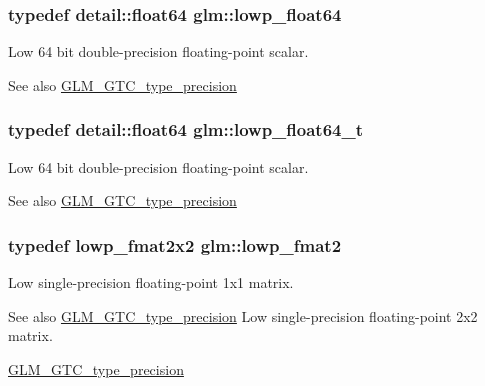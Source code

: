 \subsubsection[{\texorpdfstring{lowp\+\_\+float64}{lowp_float64}}]{\setlength{\rightskip}{0pt plus 5cm}typedef detail\+::float64 {\bf glm\+::lowp\+\_\+float64}}\hypertarget{group__gtc__type__precision_ga32e02689f4e83fb269c9047418536f2c}{}\label{group__gtc__type__precision_ga32e02689f4e83fb269c9047418536f2c}
Low 64 bit double-\/precision floating-\/point scalar. \begin{DoxySeeAlso}{See also}
\hyperlink{group__gtc__type__precision}{G\+L\+M\+\_\+\+G\+T\+C\+\_\+type\+\_\+precision} 
\end{DoxySeeAlso}
\subsubsection[{\texorpdfstring{lowp\+\_\+float64\+\_\+t}{lowp_float64_t}}]{\setlength{\rightskip}{0pt plus 5cm}typedef detail\+::float64 {\bf glm\+::lowp\+\_\+float64\+\_\+t}}\hypertarget{group__gtc__type__precision_gac9d64f4e69d6c2eade41a848077866b5}{}\label{group__gtc__type__precision_gac9d64f4e69d6c2eade41a848077866b5}
Low 64 bit double-\/precision floating-\/point scalar. \begin{DoxySeeAlso}{See also}
\hyperlink{group__gtc__type__precision}{G\+L\+M\+\_\+\+G\+T\+C\+\_\+type\+\_\+precision} 
\end{DoxySeeAlso}
\subsubsection[{\texorpdfstring{lowp\+\_\+fmat2}{lowp_fmat2}}]{\setlength{\rightskip}{0pt plus 5cm}typedef lowp\+\_\+fmat2x2 {\bf glm\+::lowp\+\_\+fmat2}}\hypertarget{group__gtc__type__precision_ga9bafb192cb7327d543ad55be2e6e675c}{}\label{group__gtc__type__precision_ga9bafb192cb7327d543ad55be2e6e675c}
Low single-\/precision floating-\/point 1x1 matrix. \begin{DoxySeeAlso}{See also}
\hyperlink{group__gtc__type__precision}{G\+L\+M\+\_\+\+G\+T\+C\+\_\+type\+\_\+precision} Low single-\/precision floating-\/point 2x2 matrix. 

\hyperlink{group__gtc__type__precision}{G\+L\+M\+\_\+\+G\+T\+C\+\_\+type\+\_\+precision} 
\end{DoxySeeAlso}
